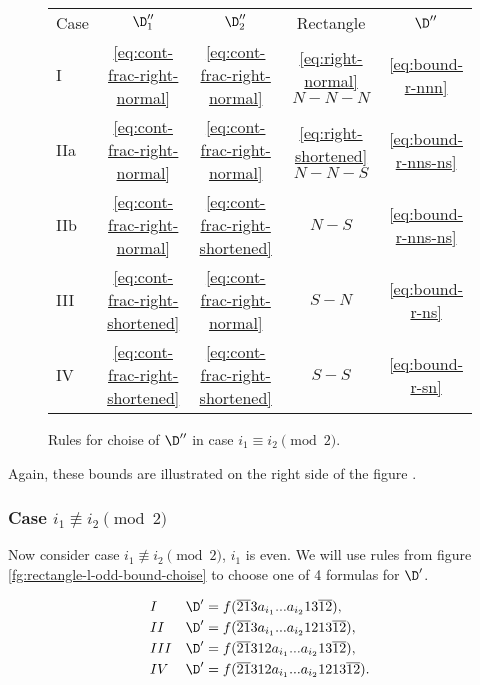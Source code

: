 \begin{figure}[ht]
	\centering
		\begin{tabular}{| l | c c c | c |}
			\cline{1-5}
				Case &
				$\D_1''$ &
				$\D_2''$ &
				Rectangle &
				$\D''$
			\\
			\cline{1-5}
				I &
				\ref{eq:cont-frac-right-normal} &
				\ref{eq:cont-frac-right-normal} &
				\ref{eq:right-normal} $N-N-N$ &
				\ref{eq:bound-r-nnn}
			\\
				IIa &
				\ref{eq:cont-frac-right-normal} &
				\ref{eq:cont-frac-right-normal} &
				\ref{eq:right-shortened} $N-N-S$ &
				\ref{eq:bound-r-nns-ns}
			\\
				IIb &
				\ref{eq:cont-frac-right-normal} &
				\ref{eq:cont-frac-right-shortened} &
				$N-S$ &
				\ref{eq:bound-r-nns-ns}
			\\
				III &
				\ref{eq:cont-frac-right-shortened} &
				\ref{eq:cont-frac-right-normal} &
				$S-N$ &
				\ref{eq:bound-r-ns}
			\\
				IV &
				\ref{eq:cont-frac-right-shortened} &
				\ref{eq:cont-frac-right-shortened} &
				$S-S$ &
				\ref{eq:bound-r-sn}
			\\
			\cline{1-5}
		\end{tabular}
	\caption{Rules for choise of $\D''$ in case $i_1 \equiv i_2 \pmod 2$.}
	\label{fg:rectangle-r-bound-choise}
\end{figure}

Again, these bounds are illustrated on the right side of the figure .

\subsubsection{Case $i_1 \not\equiv i_2 \pmod 2$}

Now consider case $i_1 \not\equiv i_2 \pmod 2$, $i_1$ is even.
We will use rules from figure \ref{fg:rectangle-l-odd-bound-choise} to choose one of 4 formulas for $\D'$.

\begin{subequations}
	\begin{align}
		\label{eq:bound-l-odd-nn}
		&&&&& I & \D' & = f(\overline{21}3a_{i_1}... a_{i_2}13\overline{12}), &&&& \\
		\label{eq:bound-l-odd-ns}
		&&&&& II & \D' & = f(\overline{21}3a_{i_1}... a_{i_2}1213\overline{12}), &&&& \\
		\label{eq:bound-l-odd-sn}
		&&&&& III & \D' & = f(\overline{21}312a_{i_1}... a_{i_2}13\overline{12}), &&&& \\
		\label{eq:bound-l-odd-ss}
		&&&&& IV & \D' & = f(\overline{21}312a_{i_1}... a_{i_2}1213\overline{12}). &&&&
	\end{align}
\end{subequations}

